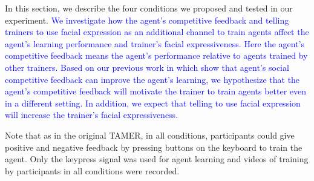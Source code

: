 
In this section, we describe the four conditions we proposed and tested in our experiment. \textcolor{blue}{We investigate how the agent's competitive feedback and telling trainers to use facial expression as an additional channel to train agents affect %
the agent's learning performance and trainer's facial expressiveness. Here the agent's competitive feedback means the agent's performance relative to agents trained by other trainers. Based on our previous work in \cite{li2014learning} which show that agent's social competitive feedback can improve the agent's learning, we hypothesize that the agent's competitive feedback will motivate the trainer to train agents better even in a different setting. %
In addition, we expect that %
telling to use facial expression will increase the trainer's facial expressiveness.}

Note that as in the original TAMER, %
in all conditions, participants could give positive and negative feedback by pressing buttons on the keyboard to train the agent. Only the keypress signal was used for agent learning and videos of training by participants in all conditions were recorded. 

